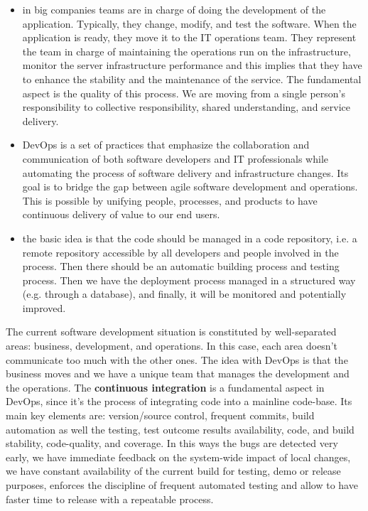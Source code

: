 \begin{itemize}
    \item in big companies teams are in charge of doing the development of the application. Typically, they change, modify, and test the software. When the application is ready, they move it to the IT operations team. They represent the team in charge of maintaining the operations run on the infrastructure, monitor the server infrastructure performance and this implies that they have to enhance the stability and the maintenance of the service. The fundamental aspect is the quality of this process. We are moving from a single person's responsibility to collective responsibility, shared understanding, and service delivery.
    \item DevOps is a set of practices that emphasize the collaboration and communication of both software developers and IT professionals while automating the process of software delivery and infrastructure changes. Its goal is to bridge the gap between agile software development and operations. This is possible by unifying people, processes, and products to have continuous delivery of value to our end users.
    \item the basic idea is that the code should be managed in a code repository, i.e. a remote repository accessible by all developers and people involved in the process. Then there should be an automatic building process and testing process. Then we have the deployment process managed in a structured way (e.g. through a database), and finally, it will be monitored and potentially improved.
\end{itemize}
The current software development situation is constituted by well-separated areas: business, development, and operations.
In this case, each area doesn't communicate too much with the other ones.
The idea with DevOps is that the business moves and we have a unique team that manages the development and the operations.
The \textbf{continuous integration} is a fundamental aspect in DevOps, since it's the process of integrating code into a mainline code-base.
Its main key elements are: version/source control, frequent commits, build automation as well the testing, test outcome results availability, code, and build stability, code-quality, and coverage.
In this ways the bugs are detected very early, we have immediate feedback on the system-wide impact of local changes, we have constant availability of the current build for testing, demo or release purposes, enforces the discipline of frequent automated testing and allow to have faster time to release with a repeatable process.
